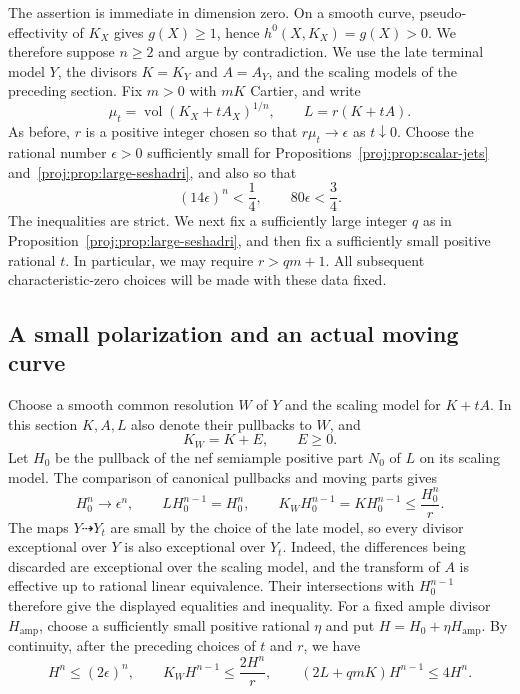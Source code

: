 \documentclass[11pt,letterpaper]{article}
\theoremstyle{definition}
\theoremstyle{remark}
\begin{document}
The assertion is immediate in dimension zero. On a smooth curve,
pseudo-effectivity of \(K_X\) gives \(g(X)\geq1\), hence
\(h^0(X,K_X)=g(X)>0\). We therefore suppose \(n\geq2\) and argue by
contradiction. We use the late terminal model \(Y\), the divisors
\(K=K_Y\) and \(A=A_Y\), and the scaling models of the preceding
section. Fix \(m>0\) with \(mK\) Cartier, and write
\[
 \mu_t=\operatorname{vol}(K_X+tA_X)^{1/n},\qquad
 L=r(K+tA).
\]
As before, \(r\) is a positive integer chosen so that
\(r\mu_t\longrightarrow\epsilon\) as \(t\downarrow0\).
Choose the rational number \(\epsilon>0\) sufficiently small for
Propositions~\ref{proj:prop:scalar-jets} and~\ref{proj:prop:large-seshadri}, and also
so that
\begin{equation}
\label{proj:fr:epsilon}
 (14\epsilon)^n<\frac14,\qquad
 80\epsilon<\frac34.
\end{equation}
The inequalities are strict. We next fix a sufficiently large integer
\(q\) as in Proposition~\ref{proj:prop:large-seshadri}, and then fix a
sufficiently small positive rational \(t\). In particular, we may require
\(r>qm+1\). All subsequent characteristic-zero choices will be made with
these data fixed.

\subsection{A small polarization and an actual moving curve}

Choose a smooth common resolution \(W\) of \(Y\) and the scaling model
for \(K+tA\). In this section \(K,A,L\) also denote their pullbacks to
\(W\), and
\[
 K_W=K+E,\qquad E\geq0.
\]
Let \(H_0\) be the pullback of the nef semiample positive part \(N_0\) of
\(L\) on its scaling model. The comparison of canonical pullbacks and
moving parts gives
\begin{equation}
\label{proj:fr:limit-intersections}
 H_0^n\longrightarrow\epsilon^n,\qquad
 LH_0^{n-1}=H_0^n,\qquad
 K_WH_0^{n-1}=KH_0^{n-1}\leq\frac{H_0^n}{r}.
\end{equation}
The maps \(Y\dashrightarrow Y_t\) are small by the choice of the late
model, so every divisor exceptional over \(Y\) is also exceptional
over \(Y_t\).
Indeed, the differences being discarded are exceptional over the
scaling model, and the transform of \(A\) is effective up to rational
linear equivalence. Their intersections with \(H_0^{n-1}\) therefore
give the displayed equalities and inequality. For a fixed ample divisor
\(H_{\mathrm{amp}}\), choose a sufficiently small positive rational
\(\eta\) and put \(H=H_0+\eta H_{\mathrm{amp}}\). By continuity, after
the preceding choices of \(t\) and \(r\), we have
\begin{equation}
\label{proj:fr:intersection-bounds}
 H^n\leq(2\epsilon)^n,\qquad
 K_WH^{n-1}\leq\frac{2H^n}{r},\qquad
 (2L+qmK)H^{n-1}\leq4H^n.
\end{equation}
\end{document}
